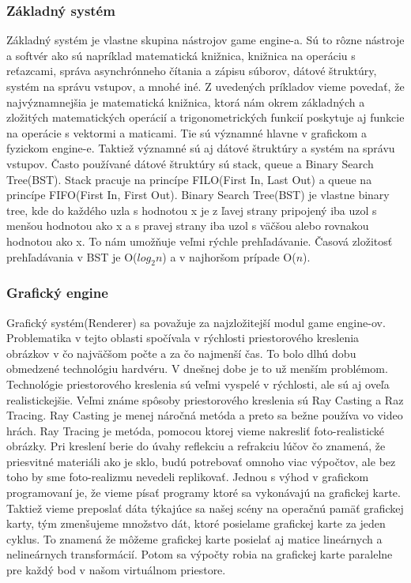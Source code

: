 \documentclass[10pt,oneside,slovak,a4paper,hidelinks]{article}
\begin{document}
		\subsubsection{Základný systém}
			Základný systém je vlastne skupina nástrojov game engine-a. Sú to rôzne nástroje a softvér ako sú napríklad matematická knižnica, knižnica na operáciu s reťazcami, správa asynchrónneho čítania a zápisu súborov, dátové štruktúry, systém na správu vstupov, a mnohé iné. Z uvedených príkladov vieme povedať, že najvýznamnejšia je matematická knižnica, ktorá nám okrem základných a zložitých matematických operácií a trigonometrických funkcií poskytuje aj funkcie na operácie s vektormi a maticami. Tie sú významné hlavne v grafickom a fyzickom engine-e. Taktiež významné sú aj dátové štruktúry a systém na správu vstupov. Často používané dátové štruktúry sú stack, queue a Binary Search Tree(BST). Stack pracuje na princípe FILO(First In, Last Out) a queue na princípe FIFO(First In, First Out). Binary Search Tree(BST) je vlastne binary tree, kde do každého uzla s hodnotou x je z ľavej strany pripojený iba uzol s menšou hodnotou ako x a s pravej strany iba uzol s väčšou alebo rovnakou hodnotou ako x. To nám umožňuje veľmi rýchle prehľadávanie. Časová zložitosť prehľadávania v BST je O($log_2n$) a v najhoršom prípade O($n$).
		\subsubsection{Grafický engine}
			Grafický systém(Renderer) sa považuje za najzložitejší modul game engine-ov. Problematika v tejto oblasti spočívala v rýchlosti priestorového kreslenia obrázkov v čo najväčšom počte a za čo najmenší čas. To bolo dlhú dobu obmedzené technológiu hardvéru. V dnešnej dobe je to už menším problémom. Technológie priestorového kreslenia sú veľmi vyspelé v rýchlosti, ale sú aj oveľa realistickejšie. Veľmi známe spôsoby priestorového kreslenia sú Ray Casting a Raz Tracing. Ray Casting je menej náročná metóda a preto sa bežne používa vo video hrách. Ray Tracing je metóda, pomocou ktorej vieme nakresliť foto-realistické obrázky. Pri kreslení berie do úvahy reflekciu a refrakciu lúčov čo znamená, že priesvitné materiáli ako je sklo, budú potrebovať omnoho viac výpočtov, ale bez toho by sme foto-realizmu nevedeli replikovať. Jednou s výhod v grafickom programovaní je, že vieme písať programy ktoré sa vykonávajú na grafickej karte. Taktiež vieme preposlať dáta týkajúce sa našej scény na operačnú pamäť grafickej karty, tým zmenšujeme množstvo dát, ktoré posielame grafickej karte za jeden cyklus. To znamená že môžeme grafickej karte posielať aj matice lineárnych a nelineárnych transformácií. Potom sa výpočty robia na grafickej karte paralelne pre každý bod v našom virtuálnom priestore.
\end{document}

